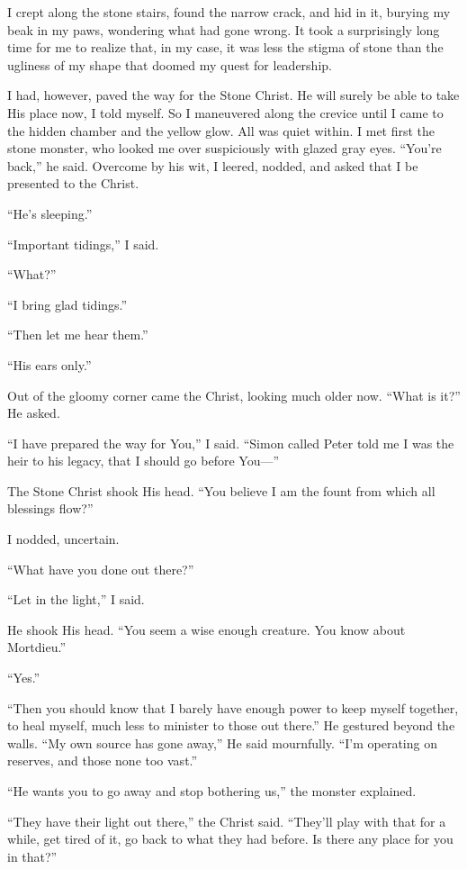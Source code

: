 I crept along the stone stairs, found the narrow crack, and hid in it, burying my beak in my paws, wondering what had gone wrong. It took a surprisingly long time for me to realize that, in my case, it was less the stigma of stone than the ugliness of my shape that doomed my quest for leadership.

I had, however, paved the way for the Stone Christ. He will surely be able to take His place now, I told myself. So I maneuvered along the crevice until I came to the hidden chamber and the yellow glow. All was quiet within. I met first the stone monster, who looked me over suspiciously with glazed gray eyes. ``You're back,'' he said. Overcome by his wit, I leered, nodded, and asked that I be presented to the Christ.

``He's sleeping.''

``Important tidings,'' I said.

``What?''

``I bring glad tidings.''

``Then let me hear them.''

``His ears only.''

Out of the gloomy corner came the Christ, looking much older now. ``What is it?'' He asked.

``I have prepared the way for You,'' I said. ``Simon called Peter told me I was the heir to his legacy, that I should go before You—''

The Stone Christ shook His head. ``You believe I am the fount from which all blessings flow?''

I nodded, uncertain.

``What have you done out there?''

``Let in the light,'' I said.

He shook His head. ``You seem a wise enough creature. You know about Mortdieu.''

``Yes.''

``Then you should know that I barely have enough power to keep myself together, to heal myself, much less to minister to those out there.'' He gestured beyond the walls. ``My own source has gone away,'' He said mournfully. ``I'm operating on reserves, and those none too vast.''

``He wants you to go away and stop bothering us,'' the monster explained.

``They have their light out there,'' the Christ said. ``They'll play with that for a while, get tired of it, go back to what they had before. Is there any place for you in that?''

